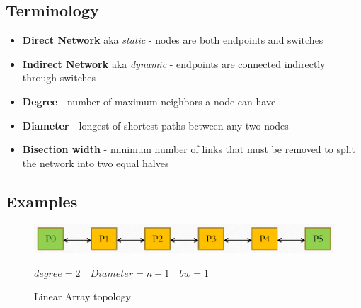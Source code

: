 \subsection{Terminology}


\begin{itemize}
   \item \textbf{Direct Network} aka \textit{static} - nodes are both endpoints and switches
   \item \textbf{Indirect Network} aka \textit{dynamic} - endpoints are connected indirectly through switches
\end{itemize}

\begin{itemize}
   \item \textbf{Degree} - number of maximum neighbors a node can have
   \item \textbf{Diameter} - longest of shortest paths between any two nodes
   \item \textbf{Bisection width} - minimum number of links that must be removed to split the network into two equal halves
\end{itemize}

\subsection{Examples}
\begin{figure}[htbp]
   \centering
   \includegraphics{images/05/linear_array.png}
   \caption{Linear Array topology}
   \label{fig:05/linear_array}

   $degree = 2 \quad Diameter = n-1 \quad bw = 1$
\end{figure}

